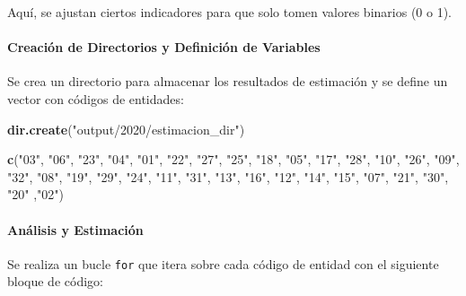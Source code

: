 \documentclass[
  12pt,
]{book}
\newenvironment{Shaded}{\begin{snugshade}}{\end{snugshade}}
\newcommand{\FunctionTok}[1]{\textcolor[rgb]{0.13,0.29,0.53}{\textbf{#1}}}
\newcommand{\NormalTok}[1]{#1}
\newcommand{\StringTok}[1]{\textcolor[rgb]{0.31,0.60,0.02}{#1}}
\begin{document}
Aquí, se ajustan ciertos indicadores para que solo tomen valores binarios (0 o 1).

\hypertarget{creaciuxf3n-de-directorios-y-definiciuxf3n-de-variables}{%
\paragraph*{Creación de Directorios y Definición de Variables}\label{creaciuxf3n-de-directorios-y-definiciuxf3n-de-variables}}

Se crea un directorio para almacenar los resultados de estimación y se define un vector con códigos de entidades:

\begin{Shaded}
\begin{Highlighting}[]
\FunctionTok{dir.create}\NormalTok{(}\StringTok{"output/2020/estimacion\_dir"}\NormalTok{)}

\FunctionTok{c}\NormalTok{(}\StringTok{"03"}\NormalTok{, }\StringTok{"06"}\NormalTok{, }\StringTok{"23"}\NormalTok{, }\StringTok{"04"}\NormalTok{, }\StringTok{"01"}\NormalTok{, }\StringTok{"22"}\NormalTok{, }\StringTok{"27"}\NormalTok{, }\StringTok{"25"}\NormalTok{, }\StringTok{"18"}\NormalTok{,}
  \StringTok{"05"}\NormalTok{, }\StringTok{"17"}\NormalTok{, }\StringTok{"28"}\NormalTok{, }\StringTok{"10"}\NormalTok{, }\StringTok{"26"}\NormalTok{, }\StringTok{"09"}\NormalTok{, }\StringTok{"32"}\NormalTok{, }\StringTok{"08"}\NormalTok{, }\StringTok{"19"}\NormalTok{, }\StringTok{"29"}\NormalTok{, }
  \StringTok{"24"}\NormalTok{, }\StringTok{"11"}\NormalTok{, }\StringTok{"31"}\NormalTok{, }\StringTok{"13"}\NormalTok{, }\StringTok{"16"}\NormalTok{, }\StringTok{"12"}\NormalTok{, }\StringTok{"14"}\NormalTok{, }\StringTok{"15"}\NormalTok{, }\StringTok{"07"}\NormalTok{, }\StringTok{"21"}\NormalTok{, }
  \StringTok{"30"}\NormalTok{,  }\StringTok{"20"}\NormalTok{ ,}\StringTok{"02"}\NormalTok{)}
\end{Highlighting}
\end{Shaded}

\hypertarget{anuxe1lisis-y-estimaciuxf3n}{%
\paragraph*{Análisis y Estimación}\label{anuxe1lisis-y-estimaciuxf3n}}

Se realiza un bucle \texttt{for} que itera sobre cada código de entidad con el siguiente bloque de código:
\end{document}
